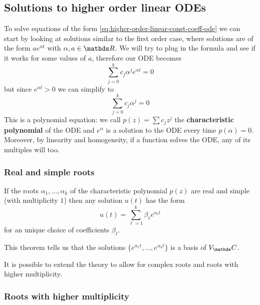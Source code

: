 \documentclass[12pt]{extarticle}
\begin{document}
\subsection{Solutions to higher order linear ODEs}

To solve equations of the form \cref{eq:higher-order-linear-const-coeff-ode} we can start by looking at solutions similar to the first order case, where solutions are of the form $a e^{\alpha t}$ with $\alpha, a \in \R$.
We will try to plug in the formula and see if it works for some values of $a$, therefore our ODE becomes
\begin{equation}
    \sum_{j = 0}^{k} c_j \alpha^j e^{\alpha t} = 0
\end{equation}
but since $e^{\alpha t} \gt 0$ we can simplify to
\begin{equation}
    \sum_{j = 0}^{k} c_j \alpha^j = 0
\end{equation}
This is a polynomial equation: we call $p(z) = \sum c_j z^j$ the \textbf{characteristic polynomial} of the ODE and $e^\alpha$ is a solution to the ODE every time $p(\alpha) = 0$.
Moreover, by linearity and homogeneity, if a function solves the ODE, any of its multiples will too.

\subsubsection{Real and simple roots}

\begin{theorem}{}{}
    If the roots $\alpha_1, \dots, \alpha_k$ of the characteristic polynomial $p(z)$ are real and simple (with multiplicity $1$) then any solution $u(t)$ has the form
    \begin{equation}
        u(t) = \sum_{\ell = 1}^{k} \beta_\ell e^{\alpha_\ell t}
    \end{equation}
    for an unique choice of coefficients $\beta_\ell$.
\end{theorem}

This theorem tells us that the solutions $\{ e^{\alpha_1 t}, \dots, e^{\alpha_k t} \}$ is a basis of $V_\C$.

It is possible to extend the theory to allow for complex roots and roots with higher multiplicity.

\subsubsection{Roots with higher multiplicity}
\end{document}
